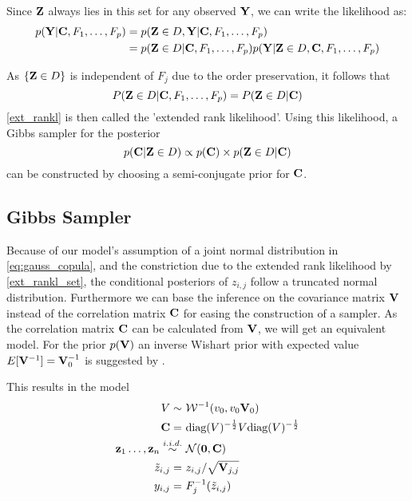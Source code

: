Since $\mathbf{Z}$ always lies in this set for any observed $\mathbf{Y}$,
we can write the likelihood as:
\begin{align*}
	p(\mathbf{Y}|\mathbf{C}, F_1, \dots, F_p) & = p(\mathbf{Z}\in D, \mathbf{Y}|\mathbf{C}, F_1, \dots, F_p) 
	\\
	                                      & =                                                      
	p(\mathbf{Z}\in D|\mathbf{C}, F_1, \dots, F_p)
	p(\mathbf{Y}|\mathbf{Z}\in D, \mathbf{C}, F_1, \dots, F_p)
	\nonumber
\end{align*}

As  $\{\mathbf{Z} \in D\}$ is independent of  $F_j$ due to the order preservation, it follows that
\begin{equation}
	\label{ext_rankl}
	P(\mathbf{Z}\in D|\mathbf{C}, F_1, \dots, F_p) = P(\mathbf{Z}\in D| \mathbf{C})
\end{equation}
\autoref{ext_rankl} is then called the 'extended rank likelihood'.
Using this likelihood, a Gibbs sampler for the posterior 
\begin{equation}
	\label{eq:posterior_copula}
	p(\mathbf{C}|\mathbf{Z}\in D)\propto p(\mathbf{C})\times p(\mathbf{Z}\in D | \mathbf{C})
\end{equation}
can be constructed by choosing a semi-conjugate prior for $\mathbf{C}$.

\subsection{Gibbs Sampler}
Because of our model's assumption of a joint normal distribution in  \autoref{eq:gauss_copula}, and the constriction due to the extended rank likelihood by \autoref{ext_rankl_set}, the conditional posteriors of $z_{i,j}$ follow a truncated normal distribution.
Furthermore we can base the inference on the covariance matrix $\mathbf{V}$ instead of the correlation matrix $\mathbf{C}$ for easing the construction of a sampler.
As the correlation matrix $\mathbf{C}$ can be calculated from $\mathbf{V}$, we will get an equivalent model.
For the prior $p(\mathbf{V})$ an inverse Wishart prior with expected value $E[\mathbf{V}^{-1}] = \mathbf{V}_{0}^{-1}$  is suggested by \citet{2007extending}.

This results in the model
\begin{align*}
	V \sim                                            & \ \mathcal{W}^{-1}(v_0, v_0\matr{V}_0)                         
	\\
	\matr{C} =                                        & \ \text{diag}(V)^{-\frac{1}{2}}V \text{diag}(V)^{-\frac{1}{2}} 
	\\
	\matr{z}_1\dots,\matr{z}_n \overset{i.i.d.}{\sim} & \  \mathcal{N}(\matr{0}, \matr{C})                             
	\\
	\tilde{z}_{i,j} =                                 & \  z_{i,j} / \sqrt{\matr{V}_{j,j}}                             
	\\
	y_{i,j} =                                         & \ F_j^{-1}(\tilde{z}_{i,j})                                    
\end{align*}

